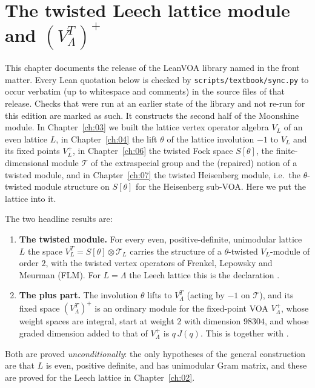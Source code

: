 \chapter{The twisted Leech lattice module and \texorpdfstring{$(V_\Lambda^T)^+$}{the twisted plus part}}\label{ch:08}

\providecommand{\cheightS}{S[\theta]}
\providecommand{\cheightT}{\mathcal{T}}
\providecommand{\cheightE}[1]{E^{#1}}
\providecommand{\cheightpair}[2]{\langle #1,#2\rangle}

This chapter documents the release of the LeanVOA library named in the front matter. Every Lean quotation below is checked by \texttt{scripts/textbook/sync.py} to occur verbatim (up to whitespace and comments) in the source files of that release. Checks that were run at an earlier state of the library and not re-run for this edition are marked as such.
It constructs the second half of the Moonshine module.  In Chapter~\ref{ch:03} we built
the lattice vertex operator algebra $V_L$ of an even lattice $L$, in Chapter~\ref{ch:04} the lift
$\theta$ of the lattice involution $-1$ to $V_L$ and its fixed points $V_L^+$, in
Chapter~\ref{ch:06} the twisted Fock space $\cheightS$, the finite-dimensional module $\cheightT$ of
the extraspecial group and the (repaired) notion of a twisted module, and in Chapter~\ref{ch:07}
the twisted Heisenberg module, i.e.\ the $\theta$-twisted module structure on $\cheightS$ for the
Heisenberg sub-VOA.  Here we put the lattice into it.

The two headline results are:
\begin{enumerate}[label=(\Alph*)]
\item \textbf{The twisted module.}  For every even, positive-definite, unimodular lattice $L$ the
  space $V_L^T=\cheightS\otimes\cheightT_L$ carries the structure of a $\theta$-twisted
  $V_L$-module of order $2$, with the twisted vertex operators of Frenkel, Lepowsky and Meurman
  (FLM).  For $L=\Lambda$ the Leech lattice this is the declaration
  .
\item \textbf{The plus part.}  The involution $\theta$ lifts to $V_\Lambda^T$ (acting by $-1$ on
  $\cheightT$), and its fixed space $(V_\Lambda^T)^+$ is an ordinary module for the fixed-point
  VOA $V_\Lambda^+$, whose weight spaces are integral, start at weight $2$ with dimension $98304$,
  and whose graded dimension added to that of $V_\Lambda^+$ is $q\,J(q)$.  This is
   together with
  .
\end{enumerate}
Both are proved \emph{unconditionally}: the only hypotheses of the general construction are that
$L$ is even, positive definite, and has unimodular Gram matrix, and these are proved for the Leech
lattice in Chapter~\ref{ch:02}.

